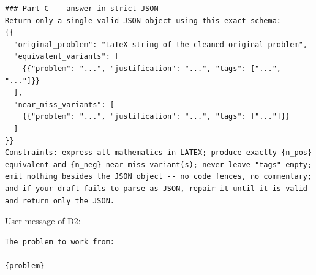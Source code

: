 \begin{Verbatim}[breaklines=true,breakanywhere=true,fontsize=\small]
### Part C -- answer in strict JSON
Return only a single valid JSON object using this exact schema:
{{
  "original_problem": "LaTeX string of the cleaned original problem",
  "equivalent_variants": [
    {{"problem": "...", "justification": "...", "tags": ["...", "..."]}}
  ],
  "near_miss_variants": [
    {{"problem": "...", "justification": "...", "tags": ["..."]}}
  ]
}}
Constraints: express all mathematics in LATEX; produce exactly {n_pos} equivalent and {n_neg} near-miss variant(s); never leave "tags" empty; emit nothing besides the JSON object -- no code fences, no commentary; and if your draft fails to parse as JSON, repair it until it is valid and return only the JSON.
\end{Verbatim}

User message of D2:
\begin{Verbatim}[breaklines=true,breakanywhere=true,fontsize=\small]
The problem to work from:

{problem}
\end{Verbatim}

